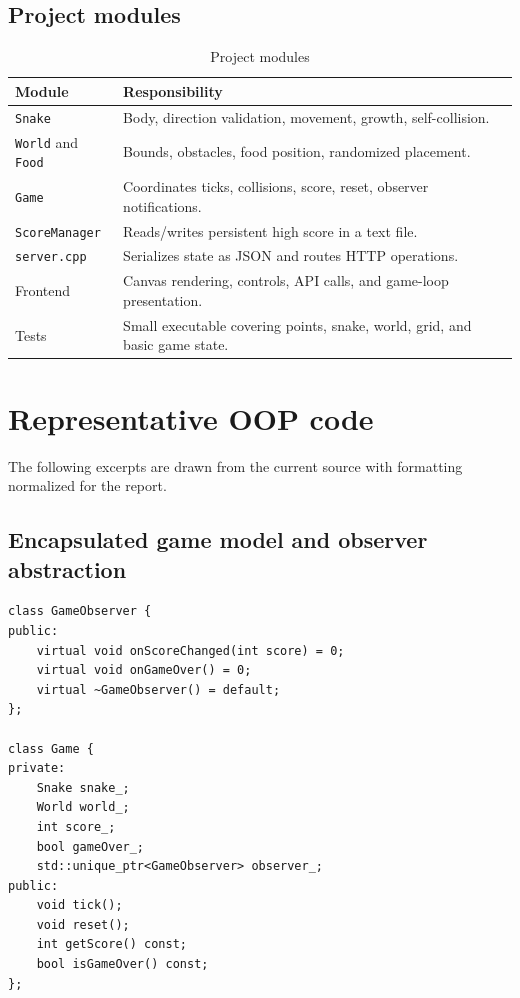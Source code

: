 \documentclass[12pt,a4paper]{report}
\begin{document}
\subsection{Project modules}
\begin{table}[H]
\centering
\caption{Project modules}
\begin{tabular}{p{35mm}p{96mm}}
\toprule
Module & Responsibility\\\midrule
\texttt{Snake} & Body, direction validation, movement, growth, self-collision.\\
\texttt{World} and \texttt{Food} & Bounds, obstacles, food position, randomized placement.\\
\texttt{Game} & Coordinates ticks, collisions, score, reset, observer notifications.\\
\texttt{ScoreManager} & Reads/writes persistent high score in a text file.\\
\texttt{server.cpp} & Serializes state as JSON and routes HTTP operations.\\
Frontend & Canvas rendering, controls, API calls, and game-loop presentation.\\
Tests & Small executable covering points, snake, world, grid, and basic game state.\\
\bottomrule
\end{tabular}
\end{table}

\section{Representative OOP code}
The following excerpts are drawn from the current source with formatting
normalized for the report.

\subsection{Encapsulated game model and observer abstraction}
\begin{lstlisting}[caption={Game owns collaborators and exposes a narrow interface},label={lst:gameclass}]
class GameObserver {
public:
    virtual void onScoreChanged(int score) = 0;
    virtual void onGameOver() = 0;
    virtual ~GameObserver() = default;
};

class Game {
private:
    Snake snake_;
    World world_;
    int score_;
    bool gameOver_;
    std::unique_ptr<GameObserver> observer_;
public:
    void tick();
    void reset();
    int getScore() const;
    bool isGameOver() const;
};
\end{lstlisting}
\end{document}
